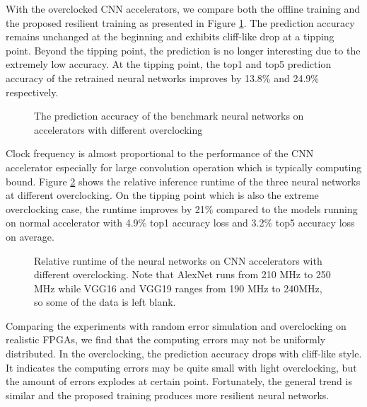 With the overclocked CNN accelerators, we compare both the offline 
training and the proposed resilient training as presented in Figure \ref{fig:overclock-accuracy}. 
The prediction accuracy remains unchanged at the beginning and exhibits cliff-like drop 
at a tipping point. Beyond the tipping point, the prediction is no longer interesting 
due to the extremely low accuracy. At the tipping point, the top1 and top5 prediction accuracy of the 
retrained neural networks improves by 13.8\% and 24.9\% respectively.

\begin{figure}
        \center
	\qquad
        \qquad
	\caption{The prediction accuracy of the benchmark neural networks on accelerators with different overclocking}
        \label{fig:overclock-accuracy}
\end{figure}

Clock frequency is almost proportional to the performance of the CNN accelerator 
especially for large convolution operation which is typically computing bound. 
Figure \ref{fig:overclocking-time} shows the relative inference runtime of the three neural networks at different 
overclocking. On the tipping point which is also the extreme overclocking case, 
the runtime improves by 21\% compared to the models running on normal accelerator with 
4.9\% top1 accuracy loss and 3.2\% top5 accuracy loss on average. 
\begin{figure}
        \caption{Relative runtime of the neural networks on CNN accelerators with different overclocking. Note that AlexNet runs from 210 MHz to 250 MHz while 
		VGG16 and VGG19 ranges from 190 MHz to 240MHz, so some of the data is left blank.}
        \label{fig:overclocking-time}
\end{figure}

Comparing the experiments with random error simulation and overclocking on realistic FPGAs, we
find that the computing errors may not be uniformly distributed. In the overclocking,  
the prediction accuracy drops with cliff-like style. It indicates the computing errors may 
be quite small with light overclocking, but the amount of errors explodes at certain point.
Fortunately, the general trend is similar and the proposed training produces more resilient 
neural networks. 


